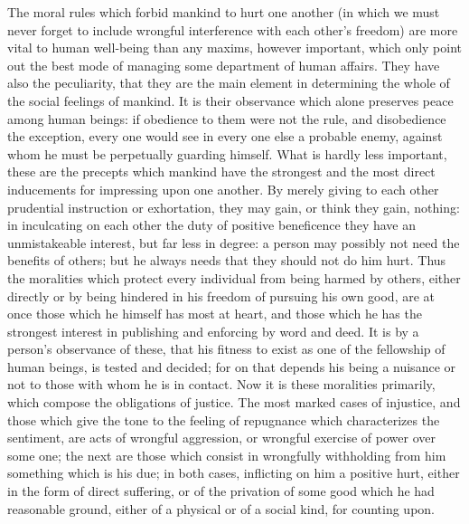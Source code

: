 \documentclass[12pt]{report}
\begin{document}
The moral rules which forbid mankind to hurt one another (in which we must never forget to include wrongful interference with each other's freedom) are more vital to human well-being than any maxims, however important, which only point out the best mode of managing some department of human affairs. They have also the peculiarity, that they are the main element in determining the whole of the social feelings of mankind. It is their observance which alone preserves peace among human beings: if obedience to them were not the rule, and disobedience the exception, every one would see in every one else a probable enemy, against whom he must be perpetually guarding himself. What is hardly less important, these are the precepts which mankind have the strongest and the most direct inducements for impressing upon one another. By merely giving to each other prudential instruction or exhortation, they may gain, or think they gain, nothing: in inculcating on each other the duty of positive beneficence they have an unmistakeable interest, but far less in degree: a person may possibly not need the benefits of others; but he always needs that they should not do him hurt. Thus the moralities which protect every individual from being harmed by others, either directly or by being hindered in his freedom of pursuing his own good, are at once those which he himself has most at heart, and those which he has the strongest interest in publishing and enforcing by word and deed. It is by a person's observance of these, that his fitness to exist as one of the fellowship of human beings, is tested and decided; for on that depends his being a nuisance or not to those with whom he is in contact. Now it is these moralities primarily, which compose the obligations of justice. The most marked cases of injustice, and those which give the tone to the feeling of repugnance which characterizes the sentiment, are acts of wrongful aggression, or wrongful exercise of power over some one; the next are those which consist in wrongfully withholding from him something which is his due; in both cases, inflicting on him a positive hurt, either in the form of direct suffering, or of the privation of some good which he had reasonable ground, either of a physical or of a social kind, for counting upon.
\end{document}
